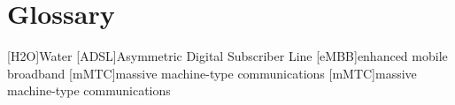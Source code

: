 \chapter{Glossary}

\footnotesize
\SingleSpacing

\begin{multicols}{2}
\begin{acronym}[AAAAAA]

	[H2O]{Water}
	[ADSL]{Asymmetric Digital Subscriber Line}
	[eMBB]{enhanced mobile broadband}
	[mMTC]{massive machine-type communications}
	[mMTC]{massive machine-type communications}

\end{acronym}
\end{multicols}

